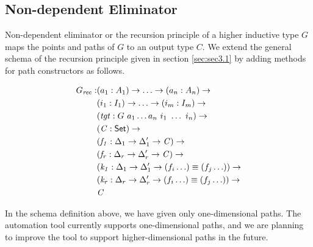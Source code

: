 \documentclass[sigplan,10pt]{acmart}
\begin{document}
\subsection{Non-dependent Eliminator}
\label{sec:sec4.2}

Non-dependent eliminator or the recursion principle of a higher inductive type $G$ maps the points and paths of $G$ to an output type $C$. We extend the general schema of the recursion principle given in section \eqref{sec:sec3.1} by adding methods for path constructors as follows.

\begin{align*}
G_{\mathit{rec}} : & (a_1 : A_1) \to \ldots \to (a_n : A_n) \to\\
& (i_1 : I_1) \to \ldots \to (i_m : I_m) \to\\
& (\mathit{tgt} : G\ a_1 \ldots a_n\ i_1\ \ldots\ i_n) \to\\
& (\mathit{C} : \textsf{Set}{}) \to \\
& (\mathit{f_1} : \Delta_1 \to  \Delta_1^\prime \to \mathit{C}) \to \\
& (\mathit{f_r} : \Delta_r \to  \Delta_r^\prime \to \mathit{C}) \to \\
& (\mathit{k_1} : \Delta_1 \to  \Delta_1^\prime \to (f_i \ldots) \equiv (f_j \ldots)) \to \\
& (\mathit{k_r} : \Delta_r \to  \Delta_r^\prime \to (f_i \ldots) \equiv (f_j \ldots)) \to \\
& \mathit{C}
\end{align*}
 
In the schema definition above, we have given only one-dimensional paths. The automation tool currently supports one-dimensional paths, and we are planning to improve the tool to support higher-dimensional paths in the future. 
\end{document}
